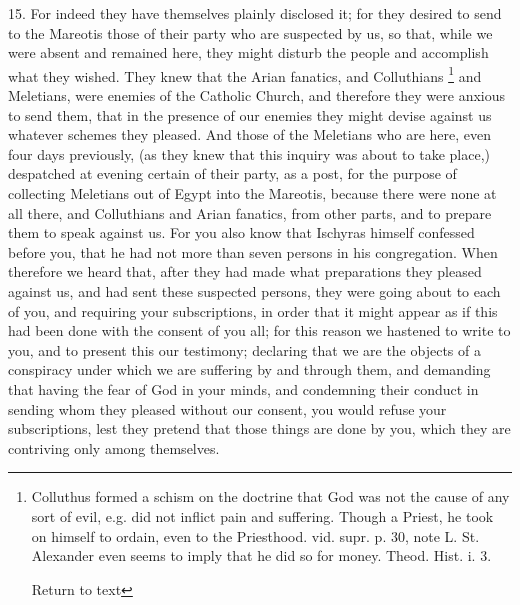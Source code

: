 15. For indeed they have themselves plainly
disclosed it; for they desired to send to the Mareotis those of their
party who are suspected by us, so that, while we were absent and
remained here, they might disturb the people and accomplish what they
wished. They knew that the Arian fanatics, and Colluthians \footnote{Colluthus formed a schism on the doctrine that God was not the cause
of any sort of evil, e.g. did not inflict pain and suffering. Though a
Priest, he took on himself to ordain, even to the Priesthood. vid.
supr. p. 30, note L. St. Alexander even seems to imply that he did so
for money. Theod. Hist. i. 3.

Return to text} and Meletians, were enemies of the Catholic Church, and
therefore they were anxious to send them, that in the presence of our
enemies they might devise against us whatever schemes they pleased.
And those of the Meletians who are here, even four days previously,
(as they knew that this inquiry was about to take place,) despatched
at evening certain of their party, as a post, for the purpose of
collecting Meletians out of Egypt into the Mareotis, because there
were none at all there, and Colluthians and Arian fanatics, from
other parts, and to prepare them to speak against us. For you also
know that Ischyras himself confessed before you, that he had not more
than seven persons in his congregation. When therefore we heard that,
after they had made what preparations they pleased against us, and had
sent these suspected persons, they were going about to each of you,
and requiring your subscriptions, in order that it might appear as if
this had been done with the consent of you all; for this reason we
hastened to write to you, and to present this our testimony; declaring
that we are the objects of a conspiracy under which we are suffering
by and through them, and demanding that having the fear of God in your
minds, and condemning their conduct in sending whom they pleased
without our consent, you would refuse your subscriptions, lest they
pretend that those things are done by you, which they are contriving
only among themselves.


